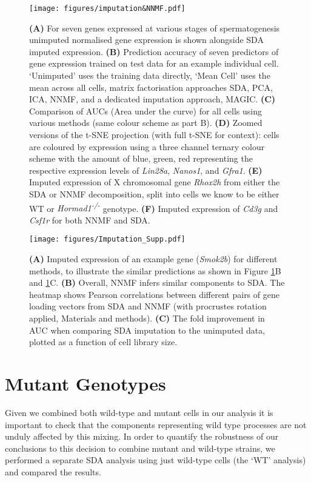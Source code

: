 \begin{figure}[H]
	\centering
	\texttt{[image: figures/imputation\&NNMF.pdf]}
	\caption{
		\textbf{(A)} For seven genes expressed at various stages of spermatogenesis unimputed normalised gene expression is shown alongside SDA imputed expression.
		\textbf{(B)} Prediction accuracy of seven predictors of gene expression trained on test data for an example individual cell. ‘Unimputed’ uses the training data directly, ‘Mean Cell’ uses the mean across all cells, matrix factorisation approaches SDA, PCA, ICA, NNMF, and a dedicated imputation approach, MAGIC.
		\textbf{(C)} Comparison of AUCs (Area under the curve) for all cells using various methods (same colour scheme as part B).
		\textbf{(D)} Zoomed versions of the t-SNE projection (with full t-SNE for context): cells are coloured by expression using a three channel ternary colour scheme with the amount of blue, green, red representing the respective expression levels of \textit{Lin28a}, \textit{Nanos1}, and \textit{Gfra1}.
		\textbf{(E)} Imputed expression of X chromosomal gene \textit{Rhox2h} from either the SDA or NNMF decomposition, split into cells we know to be either WT or \textit{Hormad1\textsuperscript{-/-}} genotype.
		\textbf{(F)} Imputed expression of \textit{Cd3g} and \textit{Csf1r} for both NNMF and SDA.}
	\label{fig:imputation}
\end{figure}

\begin{figure}[H]
	\centering
	\texttt{[image: figures/Imputation\_Supp.pdf]}
	\caption{
		\textbf{(A)} Imputed expression of an example gene (\textit{Smok2b}) for different methods, to illustrate the similar predictions as shown in Figure \ref{fig:imputation}B and \ref{fig:imputation}C.
		\textbf{(B)} Overall, NNMF infers similar components to SDA. The heatmap shows Pearson correlations between different pairs of gene loading vectors from SDA and NNMF (with procrustes rotation applied, Materials and methods).
		\textbf{(C)} The fold improvement in AUC when comparing SDA imputation to the unimputed data, plotted as a function of cell library size.
	}
	\label{fig:imputation_supp}
\end{figure}

\section{Mutant Genotypes}

Given we combined both wild-type and mutant cells in our analysis it is important to check that the components representing wild type processes are not unduly affected by this mixing. In order to quantify the robustness of our conclusions to this decision to combine mutant and wild-type strains, we performed a separate SDA analysis using just wild-type cells (the ‘WT’ analysis) and compared the results.

